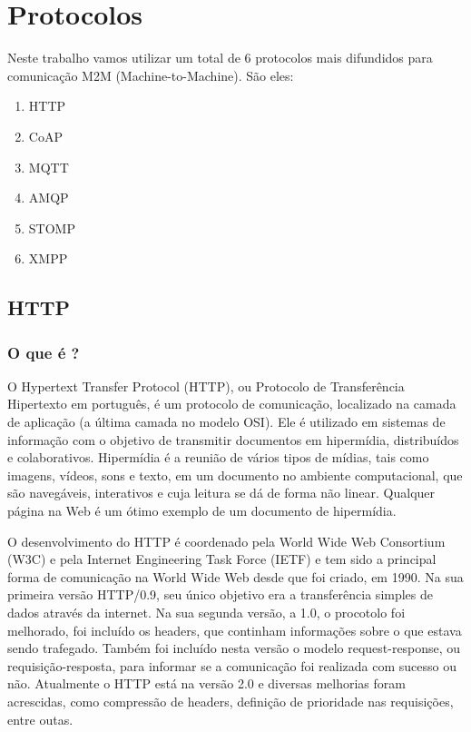 \section{Protocolos}
\label{sec:protocolos}
Neste trabalho vamos utilizar um total de 6 protocolos mais difundidos para comunicação M2M (Machine-to-Machine). São eles:
\begin{enumerate}
\item HTTP
\item CoAP
\item MQTT
\item AMQP
\item STOMP
\item XMPP
\end{enumerate}

\subsection{HTTP}

\subsubsection*{O que é ?}
O Hypertext Transfer Protocol (HTTP), ou Protocolo de Transferência Hipertexto em português, é um protocolo de comunicação, localizado na camada de aplicação (a última camada no modelo OSI). Ele é utilizado em sistemas de informação com o objetivo de transmitir documentos em hipermídia, distribuídos e colaborativos. Hipermídia é a reunião de vários tipos de mídias, tais como imagens, vídeos, sons e texto, em um documento no ambiente computacional, que são navegáveis, interativos e cuja leitura se dá de forma não linear. Qualquer página na Web é um ótimo exemplo de um documento de hipermídia. 

O desenvolvimento do HTTP é coordenado pela World Wide Web Consortium (W3C) e pela Internet Engineering Task Force (IETF) e tem sido a principal forma de comunicação na World Wide Web desde que foi criado, em 1990. Na sua primeira versão HTTP/0.9, seu único objetivo era a transferência simples de dados através da internet. Na sua segunda versão, a 1.0, o procotolo foi melhorado, foi incluído os headers, que continham informações sobre o que estava sendo trafegado. Também foi incluído nesta versão o modelo request-response, ou requisição-resposta, para informar se a comunicação foi realizada com sucesso ou não. Atualmente o HTTP está na versão 2.0 e diversas melhorias foram acrescidas, como compressão de headers, definição de prioridade nas requisições, entre outas.

